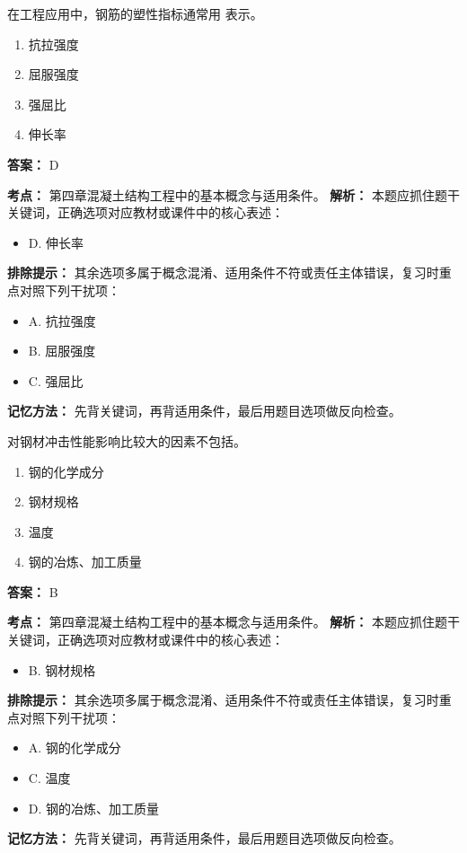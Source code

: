 \documentclass[UTF8,fontset=fandol,11pt]{ctexart}
\begin{document}
\begin{quizbox}[title={第 8 题}]
在工程应用中，钢筋的塑性指标通常用 表示。\\
\begin{enumerate}[label=\Alph*.]
\item 抗拉强度
\item 屈服强度
\item 强屈比
\item 伸长率
\end{enumerate}
\textbf{答案：} D
\vspace{0.25em}
\begin{answerbox}[title={考点解析}]
\textbf{考点：} 第四章混凝土结构工程中的基本概念与适用条件。
\textbf{解析：} 本题应抓住题干关键词，正确选项对应教材或课件中的核心表述：
\begin{itemize}
\item D. 伸长率
\end{itemize}
\textbf{排除提示：} 其余选项多属于概念混淆、适用条件不符或责任主体错误，复习时重点对照下列干扰项：
\begin{itemize}
\item A. 抗拉强度
\item B. 屈服强度
\item C. 强屈比
\end{itemize}
\textbf{记忆方法：} 先背关键词，再背适用条件，最后用题目选项做反向检查。
\end{answerbox}
\end{quizbox}

\begin{quizbox}[title={第 9 题}]
对钢材冲击性能影响比较大的因素不包括。\\
\begin{enumerate}[label=\Alph*.]
\item 钢的化学成分
\item 钢材规格
\item 温度
\item 钢的冶炼、加工质量
\end{enumerate}
\textbf{答案：} B
\vspace{0.25em}
\begin{answerbox}[title={考点解析}]
\textbf{考点：} 第四章混凝土结构工程中的基本概念与适用条件。
\textbf{解析：} 本题应抓住题干关键词，正确选项对应教材或课件中的核心表述：
\begin{itemize}
\item B. 钢材规格
\end{itemize}
\textbf{排除提示：} 其余选项多属于概念混淆、适用条件不符或责任主体错误，复习时重点对照下列干扰项：
\begin{itemize}
\item A. 钢的化学成分
\item C. 温度
\item D. 钢的冶炼、加工质量
\end{itemize}
\textbf{记忆方法：} 先背关键词，再背适用条件，最后用题目选项做反向检查。
\end{answerbox}
\end{quizbox}
\end{document}
